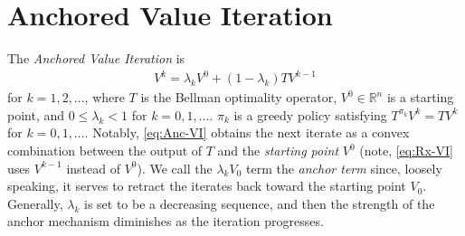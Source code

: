 \documentclass{article} %
\begin{document}

\section{Anchored Value Iteration}\label{sec::Anc-VI}
The \emph{Anchored Value Iteration} is 
\begin{align}
    V^k  =\lambda_k V^0 +(1-\lambda_k)TV^{k-1} \tag{Anc-VI}
    \label{eq:Anc-VI}
\end{align}
for $k=1,2,\dots$, where $T$ is the  Bellman optimality operator, $V^0\in \mathbb{R}^n$ is a starting point, and $0 \le \lambda_{k}<1$ for $k=0,1,\dots$. $\pi_k$ is a greedy policy satisfying $T^{\pi_k}V^k= TV^k$ for $k=0,1,\dots$. Notably, \ref{eq:Anc-VI} obtains the next iterate as a convex combination between the output of $T$ and the \emph{starting point} $V^0$ (note, \ref{eq:Rx-VI} uses $V^{k-1}$ instead of $V^0$). We call the $\lambda_k V_0$ term the \emph{anchor term} since, loosely speaking, it serves to retract the iterates back toward the starting point $V_0$. Generally, $\lambda_k$ is set to be a decreasing sequence, and then the strength of the anchor mechanism diminishes as the iteration progresses. 
\end{document}
